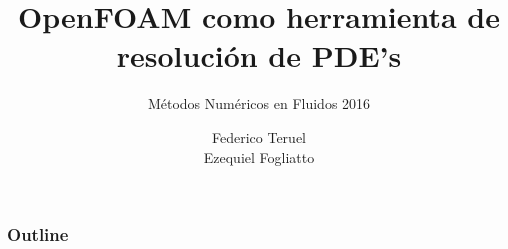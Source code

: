 \documentclass{beamer}
\author[Fogliatto, E.]{Federico Teruel \\ Ezequiel Fogliatto}
\title[OpenFOAM\textsuperscript{\textregistered} para PDE's]{OpenFOAM\textsuperscript{\textregistered} como herramienta de resoluci\'on de PDE's}
\subtitle{M\'etodos Num\'ericos en Fluidos 2016}
\institute[MECOM-IB]{Departamento de Mec\'anica Computacional - Centro At\'omico Bariloche \and Instituto Balseiro}
\begin{document}
\renewcommand{\tablename}{Tabla}
\newcommand{\bs}[1]{\boldsymbol{#1}}

    \begin{frame}
        \titlepage
    \end{frame}

    \begin{frame}
        \frametitle{Outline}
        \tableofcontents
    \end{frame}
    








        

    
\end{document}
